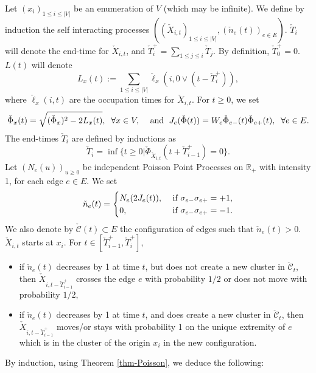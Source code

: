 \documentclass[11pt,a4paper]{amsart}
\numberwithin{equation}{section}
\def\ccc{{\mathcal C}}
\def\R{{\mathbb R}}
\begin{document}
Let $(x_{i})_{1\leq i\leq\vert V\vert}$ be an enumeration of $V$ (which may be infinite).
We define by induction the self interacting processes
$((\check X_{i,t})_{1\leq i\leq\vert V\vert}, 
(\check n_e(t))_{e\in E})$. 
$\check{T}_{i}$ will denote the end-time for $\check X_{i,t}$, and
$\check{T}^{+}_{i}=\sum_{1\leq j\leq i}\check{T}_{j}$.
By definition, $\check{T}^{+}_{0}=0$.
$L(t)$ will denote
\begin{displaymath}
L_{x}(t):=\sum_{1\leq i\leq\vert V\vert}
\check{\ell}_{x}(i,0\vee(t-\check{T}^{+}_{i})),
\end{displaymath}
where $\check{\ell}_{x}(i,t)$ are the occupation times for
$\check X_{i,t}$.
For $t\ge 0$, we set
$$
\check\Phi_x(t)=\sqrt{(\check\Phi_x)^2-2L_x(t)},\;\;\forall x\in V,\;\;\;\hbox{ and }\;
J_e(\check\Phi(t))=W_e \check\Phi_{e-}(t)\check\Phi_{e+}(t), \;\; \forall e\in E.
$$
The end-times $\check{T}_{i}$ are defined by inductions as
\begin{displaymath}
\check{T}_{i}=\inf\lbrace t\geq 0\vert 
\check{\Phi}_{\check{X}_{i,t}}(t+\check{T}^{+}_{i-1})=0\rbrace.
\end{displaymath}
Let $(N_e(u))_{u\ge 0}$ be independent Poisson Point Processes on $\R_+$ with intensity 1, for each edge $e\in E$.
We set
$$
\check n_e(t)=
\begin{cases} 
N_e(2J_e(t)), &\hbox{ if } \sigma_{e-}\sigma_{e+}=+1,
\\
0, &\hbox{ if } \sigma_{e-}\sigma_{e+}=-1.
\end{cases}
$$
We also denote by $\check \ccc(t)\subset E$ the configuration of edges such that $\check n_e(t)>0$.
$\check X_{i,t}$ starts at $x_{i}$.
For $t\in[\check{T}^{+}_{i-1},\check{T}^{+}_{i}]$,
\begin{itemize}
\item
if $\check n_e(t)$ decreases by 1 at time $t$, but does not create a new cluster in $\check \ccc_t$, then $\check X_{i,t-\check{T}^{+}_{i-1}}$ crosses the edge
$e$ with probability ${1/2}$ or does not move with probability ${1/2}$,
\item
if $\check n_e(t)$ decreases by 1 at time $t$, and does create a new cluster in $\check \ccc_t$,
 then $\check X_{i,t-\check{T}^{+}_{i-1}}$ moves/or stays with probability 1 on the unique extremity
of $e$ which is in the cluster of the origin $x_i$ in the new configuration.
\end{itemize}

By induction, using Theorem \ref{thm-Poisson}, we deduce the following:
\end{document}
